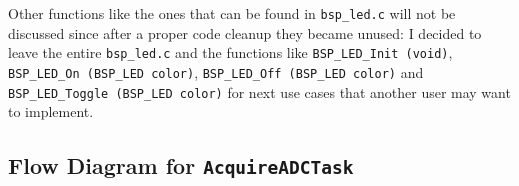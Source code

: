 \documentclass[a4paper]{article}
\begin{document}
        Other functions like the ones that can be found in \texttt{bsp\_led.c} will not be discussed since after a proper code cleanup they became unused: I decided to leave the entire \texttt{bsp\_led.c} and the functions like \texttt{BSP\_LED\_Init (void)}, \texttt{BSP\_LED\_On (BSP\_LED color)}, \texttt{BSP\_LED\_Off (BSP\_LED color)} and \texttt{BSP\_LED\_Toggle (BSP\_LED color)} for next use cases that another user may want to implement.

        \newpage

        \subsection{Flow Diagram for \texttt{AcquireADCTask}}



    
\end{document}
